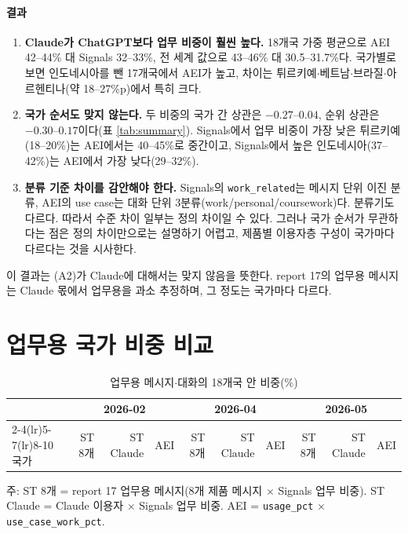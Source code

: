 \documentclass[11pt]{article}
\begin{document}
\paragraph{결과}
\begin{enumerate}[leftmargin=*]
  \item \textbf{Claude가 ChatGPT보다 업무 비중이 훨씬 높다.} 18개국 가중 평균으로 AEI 42--44\% 대 Signals 32--33\%, 전 세계 값으로 43--46\% 대 30.5--31.7\%다. 국가별로 보면 인도네시아를 뺀 17개국에서 AEI가 높고, 차이는 튀르키예$\cdot$베트남$\cdot$브라질$\cdot$아르헨티나(약 18--27\%p)에서 특히 크다.
  \item \textbf{국가 순서도 맞지 않는다.} 두 비중의 국가 간 상관은 $-0.27$--$0.04$, 순위 상관은 $-0.30$--$0.17$이다(표 \ref{tab:summary}). Signals에서 업무 비중이 가장 낮은 튀르키예(18--20\%)는 AEI에서는 40--45\%로 중간이고, Signals에서 높은 인도네시아(37--42\%)는 AEI에서 가장 낮다(29--32\%).
  \item \textbf{분류 기준 차이를 감안해야 한다.} Signals의 \texttt{work\_related}는 메시지 단위 이진 분류, AEI의 use case는 대화 단위 3분류(work/personal/coursework)다. 분류기도 다르다. 따라서 수준 차이 일부는 정의 차이일 수 있다. 그러나 국가 순서가 무관하다는 점은 정의 차이만으로는 설명하기 어렵고, 제품별 이용자층 구성이 국가마다 다르다는 것을 시사한다.
\end{enumerate}

이 결과는 (A2)가 Claude에 대해서는 맞지 않음을 뜻한다. report 17의 업무용 메시지는 Claude 몫에서 업무용을 과소 추정하며, 그 정도는 국가마다 다르다.

\section{업무용 국가 비중 비교}

\begin{table}[htbp]
\centering
\small
\caption{업무용 메시지$\cdot$대화의 18개국 안 비중(\%)}\label{tab:workshare}
\begin{tabular}{lrrrrrrrrr}
\toprule
 & \multicolumn{3}{c}{2026-02} & \multicolumn{3}{c}{2026-04} & \multicolumn{3}{c}{2026-05} \\
\cmidrule(lr){2-4}\cmidrule(lr){5-7}\cmidrule(lr){8-10}
국가 & ST 8개 & ST Claude & AEI & ST 8개 & ST Claude & AEI & ST 8개 & ST Claude & AEI \\
\midrule

\bottomrule
\end{tabular}
\par\smallskip\footnotesize 주: ST 8개 = report 17 업무용 메시지(8개 제품 메시지 $\times$ Signals 업무 비중). ST Claude = Claude 이용자 $\times$ Signals 업무 비중. AEI = \texttt{usage\_pct} $\times$ \texttt{use\_case\_work\_pct}.
\end{table}
\end{document}
